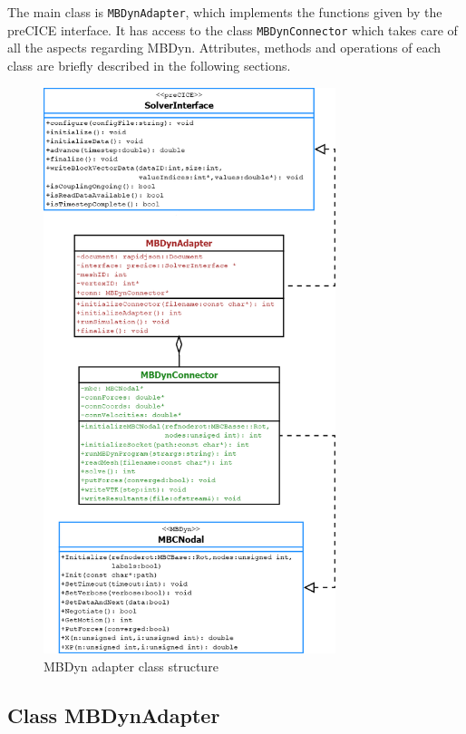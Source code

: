 The main class is \texttt{MBDynAdapter}, which implements the functions given by the preCICE interface. It has access to the class \texttt{MBDynConnector} which takes care of all the aspects regarding MBDyn. Attributes, methods and operations of each class are briefly described in the following sections.

\begin{figure}[htbp!]
	\centering
	\includegraphics[width=0.76\textwidth]{images/classdiag2}
	\caption{MBDyn adapter class structure}
	\label{fig:adapter-classdiag}
\end{figure}


\subsection{Class MBDynAdapter}
\label{sec:mbdyn-adapter.h}

